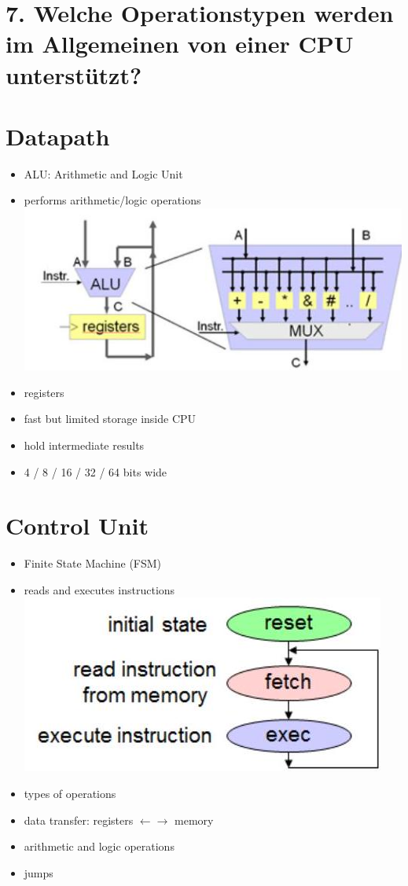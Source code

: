 \documentclass[10pt]{article}
\begin{document}
\section*{7. Welche Operationstypen werden im Allgemeinen von einer CPU unterstützt?}
\section*{Datapath}
\begin{itemize}
  \item ALU: Arithmetic and Logic Unit
  \item performs arithmetic/logic operations\\
\includegraphics[max width=\textwidth, center]{2025_01_02_f240dc33b50f25226887g-3(1)}
  \item registers
  \item fast but limited storage inside CPU
  \item hold intermediate results
  \item 4 / 8 / 16 / 32 / 64 bits wide
\end{itemize}

\section*{Control Unit}
\begin{itemize}
  \item Finite State Machine (FSM)
  \item reads and executes instructions\\
\includegraphics[max width=\textwidth, center]{2025_01_02_f240dc33b50f25226887g-3}
  \item types of operations
  \item data transfer: registers $\leftarrow \rightarrow$ memory
  \item arithmetic and logic operations
  \item jumps
\end{itemize}
\end{document}
